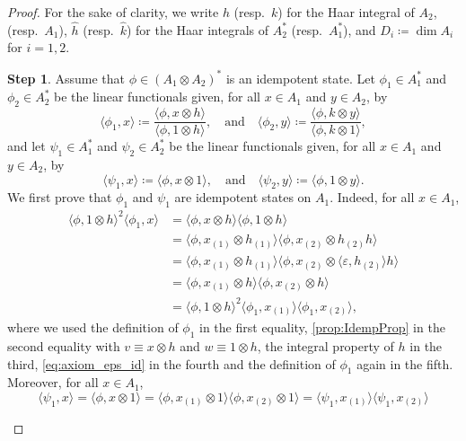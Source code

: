 \documentclass[a4paper,10pt]{amsart}
\newcommand{\eval}[2]{\langle #1 , #2\rangle}
\theoremstyle{definition}
\newtheorem{step-goursat}{Step}
\begin{document}
\begin{proof}
For the sake of clarity, we write $h$ (resp.~$k$) for the Haar integral of $A_2$, (resp.~$A_1$), $\hat{h}$ (resp.~$\hat{k}$) for the Haar integrals of $A_2^*$ (resp.~$A_1^*$), and $D_i \coloneqq \dim A_i$ for $i=1,2$.

\begin{step-goursat}
Assume that $\phi\in (A_1\otimes A_2)^*$ is an idempotent state.
Let $\phi_1\in A_1^*$ and $\phi_2\in A_2^*$ be the linear functionals given, for all $x\in A_1$ and $y\in A_2$, by
\[
    \eval{\phi_1}{x}
        \coloneqq
        \frac{\eval{\phi}{x\otimes h}}{\eval{\phi}{1\otimes h}}
    ,\quad\text{and}\quad
    \eval{ \phi_2 }{ y }
        \coloneqq
        \frac{\eval{\phi}{k\otimes y}}{\eval{\phi}{k\otimes 1}},
\]
and let $\psi_1\in A_1^*$ and $\psi_2\in A_2^*$ be the linear functionals given, for all $x\in A_1$ and $y\in A_2$, by
\[
    \eval{\psi_1}{x}
        \coloneqq
        \eval{\phi}{x\otimes 1}
    ,\quad\text{and}\quad
     \eval{\psi_2}{y}
        \coloneqq
        \eval{\phi}{1\otimes y}.
\]
We first prove that \(\phi_1\) and \(\psi_1\) are idempotent states on \(A_1\). Indeed, for all $x\in A_1$,
\begin{align*}
    \eval{\phi}{1\otimes h}^2
        \eval{\phi_1}{x}
    &=
    \eval{\phi}{x\otimes h}
        \eval{\phi}{1\otimes h}
    \\
    &=
    \eval{\phi}{x_{(1)}\otimes h_{(1)}}
        \eval{\phi}{x_{(2)}\otimes h_{(2)}h}
    \\
    &=
    \eval{\phi}{x_{(1)}\otimes h_{(1)}}
        \eval{\phi}{x_{(2)}\otimes \eval{\varepsilon}{h_{(2)}}h}
    \\
    &=
    \eval{\phi}{x_{(1)}\otimes h}
        \eval{\phi}{x_{(2)}\otimes h}
    \\
    &=
    \eval{\phi}{1\otimes h}^2
        \eval{\phi_1}{x_{(1)}}
            \eval{\phi_1}{x_{(2)}},
\end{align*}
where we used the definition of $\phi_1$ in the first equality, \cref{prop:IdempProp} in the second equality with $v \equiv x\otimes h$ and $w \equiv 1\otimes h$, the integral property of $h$ in the third, \cref{eq:axiom_eps_id} in the fourth and the definition of $\phi_1$ again in the fifth.
Moreover, for all $x\in A_1$,
\begin{equation*}
    \eval{\psi_1}{x}
    =
    \eval{\phi}{x\otimes 1}
    =
    \eval{\phi}{x_{(1)}\otimes 1}
        \eval{\phi}{x_{(2)}\otimes 1}
    =
    \eval{\psi_1}{x_{(1)}}
        \eval{\psi_1}{x_{(2)}}
\end{equation*}

\end{step-goursat}
\end{proof}
\end{document}
